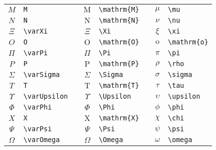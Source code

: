 \begin{table}[h]
\begin{center}
\begin{tabular}{c p{15ex} p{5ex} c p{15ex} p{5ex} c p{15ex}}
	$M$           & \texttt{M}                          && $\mathrm{M}$  & \texttt{\textbackslash mathrm\{M\}} && $\mu$         & \texttt{\textbackslash mu}          \\
	$N$           & \texttt{N}                          && $\mathrm{N}$  & \texttt{\textbackslash mathrm\{N\}} && $\nu$         & \texttt{\textbackslash nu}          \\
	$\varXi$      & \texttt{\textbackslash varXi}       && $\Xi$         & \texttt{\textbackslash Xi}          && $\xi$         & \texttt{\textbackslash xi}          \\
	$O$           & \texttt{O}                          && $\mathrm{O}$  & \texttt{\textbackslash mathrm\{O\}} && $\mathrm{o}$  & \texttt{\textbackslash mathrm\{o\}} \\
	$\varPi$      & \texttt{\textbackslash varPi}       && $\Pi$         & \texttt{\textbackslash Pi}          && $\pi$         & \texttt{\textbackslash pi}          \\
	$P$           & \texttt{P}                          && $\mathrm{P}$  & \texttt{\textbackslash mathrm\{P\}} && $\rho$        & \texttt{\textbackslash rho}         \\
	$\varSigma$   & \texttt{\textbackslash varSigma}    && $\Sigma$      & \texttt{\textbackslash Sigma}       && $\sigma$      & \texttt{\textbackslash sigma}       \\
	$T$           & \texttt{T}                          && $\mathrm{T}$  & \texttt{\textbackslash mathrm\{T\}} && $\tau$        & \texttt{\textbackslash tau}         \\
	$\varUpsilon$ & \texttt{\textbackslash varUpsilon}  && $\Upsilon$    & \texttt{\textbackslash Upsilon}     && $\upsilon$    & \texttt{\textbackslash upsilon}     \\
	$\varPhi$     & \texttt{\textbackslash varPhi}      && $\Phi$        & \texttt{\textbackslash Phi}         && $\phi$        & \texttt{\textbackslash phi}         \\
	$X$           & \texttt{X}                          && $\mathrm{X}$  & \texttt{\textbackslash mathrm\{X\}} && $\chi$        & \texttt{\textbackslash chi}         \\
	$\varPsi$     & \texttt{\textbackslash varPsi}      && $\Psi$        & \texttt{\textbackslash Psi}         && $\psi$        & \texttt{\textbackslash psi}         \\
	$\varOmega$   & \texttt{\textbackslash varOmega}    && $\Omega$      & \texttt{\textbackslash Omega}       && $\omega$      & \texttt{\textbackslash omega}       \\
	\hline
\end{tabular}
\end{center}
\end{table}

